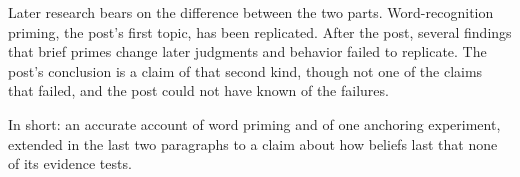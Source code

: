 \begin{afterword}
Later research bears on the difference between the two parts. Word-recognition priming, the post's first topic, has been replicated. After the post, several findings that brief primes change later judgments and behavior failed to replicate. The post's conclusion is a claim of that second kind, though not one of the claims that failed, and the post could not have known of the failures.

In short: an accurate account of word priming and of one anchoring experiment, extended in the last two paragraphs to a claim about how beliefs last that none of its evidence tests.
\end{afterword}
